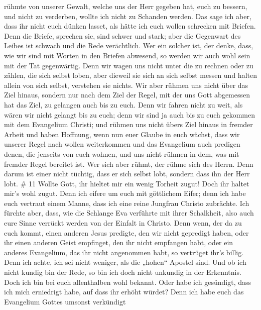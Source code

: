 rühmte von unserer Gewalt, welche uns der Herr gegeben hat, euch zu
bessern, und nicht zu verderben, wollte ich nicht zu Schanden werden.
 Das sage ich aber, dass ihr nicht euch dünken lasset, als
hätte ich euch wollen schrecken mit Briefen.  Denn die
Briefe, sprechen sie, sind schwer und stark; aber die Gegenwart des
Leibes ist schwach und die Rede verächtlich.  Wer ein
solcher ist, der denke, dass, wie wir sind mit Worten in den Briefen
abwesend, so werden wir auch wohl sein mit der Tat gegenwärtig.
 Denn wir wagen uns nicht unter die zu rechnen oder zu
zählen, die sich selbst loben, aber dieweil sie sich an sich selbst
messen und halten allein von sich selbst, verstehen sie nichts.
 Wir aber rühmen uns nicht über das Ziel hinaus, sondern
nur nach dem Ziel der Regel, mit der uns Gott abgemessen hat das Ziel,
zu gelangen auch bis zu euch.  Denn wir fahren nicht zu
weit, als wären wir nicht gelangt bis zu euch; denn wir sind ja auch bis
zu euch gekommen mit dem Evangelium Christi;  und rühmen
uns nicht übers Ziel hinaus in fremder Arbeit und haben Hoffnung, wenn
nun euer Glaube in euch wächst, dass wir unserer Regel nach wollen
weiterkommen  und das Evangelium auch predigen denen, die
jenseits von euch wohnen, und uns nicht rühmen in dem, was mit fremder
Regel bereitet ist.  Wer sich aber rühmt, der rühme sich
des Herrn.  Denn darum ist einer nicht tüchtig, dass er
sich selbst lobt, sondern dass ihn der Herr lobt. \# 11 
Wollte Gott, ihr hieltet mir ein wenig Torheit zugut! Doch ihr haltet
mir's wohl zugut.  Denn ich eifere um euch mit göttlichem
Eifer; denn ich habe euch vertraut einem Manne, dass ich eine reine
Jungfrau Christo zubrächte.  Ich fürchte aber, dass, wie die
Schlange Eva verführte mit ihrer Schalkheit, also auch eure Sinne
verrückt werden von der Einfalt in Christo.  Denn wenn, der
da zu euch kommt, einen anderen Jesus predigte, den wir nicht gepredigt
haben, oder ihr einen anderen Geist empfinget, den ihr nicht empfangen
habt, oder ein anderes Evangelium, das ihr nicht angenommen habt, so
vertrüget ihr's billig.  Denn ich achte, ich sei nicht
weniger, als die „hohen`` Apostel sind.  Und ob ich nicht
kundig bin der Rede, so bin ich doch nicht unkundig in der Erkenntnis.
Doch ich bin bei euch allenthalben wohl bekannt.  Oder habe
ich gesündigt, dass ich mich erniedrigt habe, auf dass ihr erhöht
würdet? Denn ich habe euch das Evangelium Gottes umsonst verkündigt
